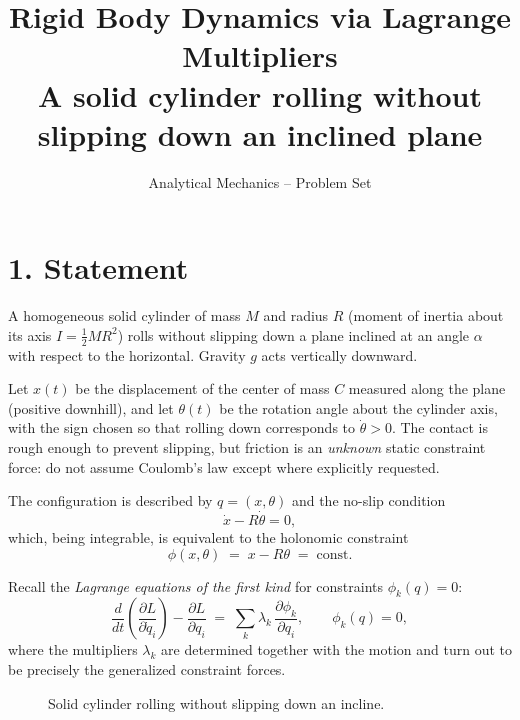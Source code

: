 \documentclass[11pt]{article}
\title{\textbf{Rigid Body Dynamics via Lagrange Multipliers}\\[2pt]
\large A solid cylinder rolling without slipping down an inclined plane}
\author{Analytical Mechanics -- Problem Set}
\date{}
\begin{document}
\maketitle

\section*{1. Statement}

A homogeneous solid cylinder of mass $M$ and radius $R$ (moment of inertia about its
axis $I = \tfrac{1}{2}MR^{2}$) rolls without slipping down a plane inclined at an
angle $\alpha$ with respect to the horizontal. Gravity $g$ acts vertically downward.

Let $x(t)$ be the displacement of the center of mass $C$ measured along the plane
(positive downhill), and let $\theta(t)$ be the rotation angle about the cylinder
axis, with the sign chosen so that rolling down corresponds to $\dot\theta > 0$.
The contact is rough enough to prevent slipping, but friction is an
\emph{unknown} static constraint force: do not assume Coulomb's law except where
explicitly requested.

The configuration is described by $q = (x,\theta)$ and the no-slip condition
\[
  \dot x - R\dot\theta = 0 ,
\]
which, being integrable, is equivalent to the holonomic constraint
\[
  \phi(x,\theta) \;=\; x - R\theta \;=\; \text{const.}
\]

Recall the \emph{Lagrange equations of the first kind} for constraints
$\phi_k(q)=0$:
\[
  \frac{d}{dt}\!\left(\frac{\partial L}{\partial \dot q_i}\right)
  - \frac{\partial L}{\partial q_i}
  \;=\; \sum_{k} \lambda_k \,\frac{\partial \phi_k}{\partial q_i},
  \qquad \phi_k(q) = 0 ,
\]
where the multipliers $\lambda_k$ are determined together with the motion and
turn out to be precisely the generalized constraint forces.

\begin{figure}[ht]
  \centering
  \caption{Solid cylinder rolling without slipping down an incline.}
\end{figure}
\end{document}
